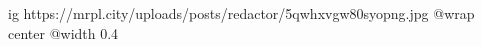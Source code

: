  
 
 
 
 

\ifcmt
  ig https://mrpl.city/uploads/posts/redactor/5qwhxvgw80syopng.jpg
	@wrap center
	@width 0.4
\fi

